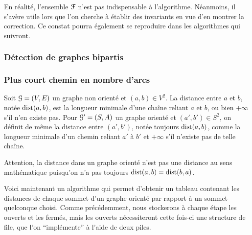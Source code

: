 			\begin{Remarque}
				En réalité, l'ensemble \(\EuScript{F}\) n'est pas indispensable à l'algorithme. Néanmoins, il s'avère utile lors que l'on cherche à établir des invariants en vue d'en montrer la correction. \nt
				Ce constat pourra également se reproduire dans les algorithmes qui suivront.
			\end{Remarque}
		
		\subsubsection{Détection de graphes bipartis}
		
		\subsubsection{Plus court chemin en nombre d'arcs}
		
			\begin{Definition}
				Soit \(\EuScript{G} = (V,E)\) un graphe non orienté et \((a,b) \in V^2\). La distance entre \(a\) et \(b\), notée \(\operatorname{dist}(a,b)\), est la longueur minimale d'une chaîne reliant \(a\) et \(b\), ou bien \(+\infty\) s'il n'en existe pas. \nt
				Pour \(\EuScript{G}' = (S,A)\) un graphe orienté et \((a',b')\in S^2\), on définit de même la distance entre \((a',b')\), notée toujours \(\operatorname{dist}(a,b)\), comme la longueur minimale d'un chemin reliant \(a'\) à \(b'\) et \(+\infty\) s'il n'existe pas de telle chaîne.
			\end{Definition}
			
			\vs{2}
			\begin{Exemple}
			\end{Exemple}
			
			\vs{2}
			\begin{Remarque}
				Attention, la distance dans un graphe orienté n'est pas une distance au sens mathématique puisqu'on n'a pas toujours \(\operatorname{dist}(a,b) = \operatorname{dist}(b,a)\). 
			\end{Remarque}
			
			Voici maintenant un algorithme qui permet d'obtenir un tableau contenant les distances de chaque sommet d'un graphe orienté par rapport à un sommet quelconque choisi. \nll
			Comme précédemment, nous stockerons à chaque étape les ouverts et les fermés, mais les ouverts nécessiteront cette fois-ci une structure de file, que l'on ``implémente'' à l'aide de deux piles.
			
